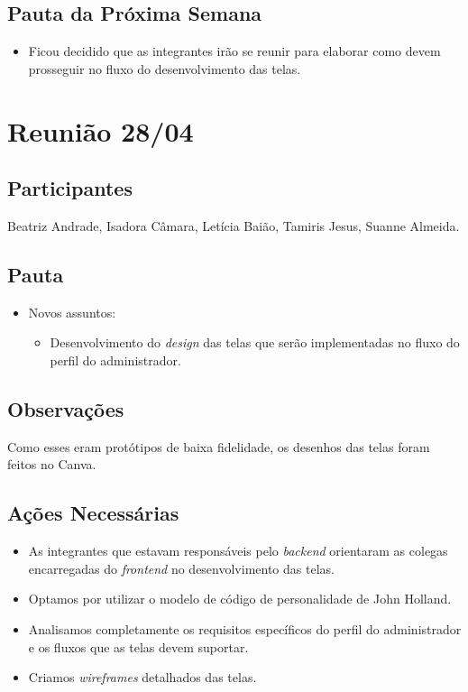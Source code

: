 \begin{apendicesenv}
\subsection*{Pauta da Próxima Semana}
\begin{itemize}
    \item Ficou decidido que as integrantes irão se reunir para elaborar como devem prosseguir no fluxo do desenvolvimento das telas.
\end{itemize}

\section*{Reunião 28/04}

\subsection*{Participantes}
Beatriz Andrade, Isadora Câmara, Letícia Baião, Tamiris Jesus, Suanne Almeida.

\subsection*{Pauta}
\begin{itemize}
    \item Novos assuntos:
    \begin{itemize}
        \item Desenvolvimento do \textit{design} das telas que serão implementadas no fluxo do perfil do administrador.
    \end{itemize}
\end{itemize}

\subsection*{Observações}
Como esses eram protótipos de baixa fidelidade, os desenhos das telas foram feitos no Canva.

\subsection*{Ações Necessárias}
\begin{itemize}
    \item As integrantes que estavam responsáveis pelo \textit{backend} orientaram as colegas encarregadas do \textit{frontend} no desenvolvimento das telas.
    \item Optamos por utilizar o modelo de código de personalidade de John Holland.
    \item Analisamos completamente os requisitos específicos do perfil do administrador e os fluxos que as telas devem suportar.
    \item Criamos \textit{wireframes} detalhados das telas.
\end{itemize}


\end{apendicesenv}
